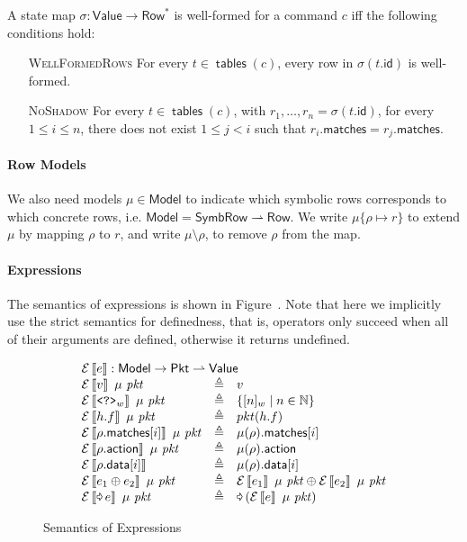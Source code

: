\documentclass{article}
\newcommand{\pkt}{\mathit{pkt}}
\newcommand{\denote}[1]{\left\llbracket#1\right\rrbracket}
\newcommand{\edenote}[1]{\mathcal{E}\denote{#1}}
\newcommand{\binop}{\mathbin{\oplus}}
\newcommand{\unop}{\mathop{\text{\pointer}}}
\newcommand{\Value}{\mathsf{Value}}
\newcommand{\Pkt}{\mathsf{Pkt}}
\newcommand{\Model}{\mathsf{Model}}
\newcommand{\Row}{\mathsf{Row}}
\newcommand{\SymbRow}{\mathsf{SymbRow}}
\newcommand{\matches}{\mathsf{matches}}
\newcommand{\action}{\mathsf{action}}
\newcommand{\data}{\mathsf{data}}
\newcommand{\id}{\mathsf{id}}
\newcommand{\havoc}{\texttt{<?>}}
\newcommand{\tables}{\mathop{\mathsf{tables}}}
\begin{document}
A state map $\sigma : \Value \to \Row^*$ is well-formed for a command $c$ iff the
following conditions hold:
\begin{enumerate}
\item[\textsc{WellFormedRows}] For every $t\in \tables(c)$, every row in $\sigma(t.\id)$ is well-formed.
\item[\textsc{NoShadow}] For every $t \in \tables(c)$, with $r_1,\ldots,r_n =
  \sigma(t.\id)$, for every $1 \leq i \leq n$, there does not exist $1 \leq j <
  i$ such that $r_i.\matches = r_j.\matches$.
\end{enumerate}
\paragraph{Row Models}
We also need models $\mu \in \Model$ to indicate which symbolic rows corresponds
to which concrete rows, i.e. $\Model = \SymbRow \rightharpoonup \Row$. We write
$\mu\{\rho \mapsto r\}$ to extend $\mu$ by mapping $\rho$ to $r$, and write $\mu
\setminus \rho$, to remove $\rho$ from the map.

\paragraph{Expressions}
The semantics of expressions is shown in Figure~\label{fig:sem-expr}. Note that
here we implicitly use the strict semantics for definedness, that is, operators
only succeed when all of their arguments are defined, otherwise it returns
undefined.

\begin{figure}[H]
  \[\begin{array}{l>{\triangleq}cl}
  \multicolumn{3}{l}{\edenote{e} : \Model \to \Pkt \rightharpoonup \Value }\\
    \edenote{v}~\mu~\pkt &&
    v \\
    \edenote{\havoc_w}~\mu~\pkt && \{[n]_w \mid n \in \mathbb N\}\\
    \edenote{h.f}~\mu~\pkt &&
    pkt(h.f)\\
    \edenote{\rho.\matches[i]}~\mu~\pkt &&
    \mu(\rho).\matches[i] \\
    \edenote{\rho.\action}~\mu~\pkt &&
    \mu(\rho).\action \\
    \edenote{\rho.\data[i]} &&
    \mu(\rho).\data[i]\\
    \edenote{e_1 \binop e_2}~\mu~\pkt&&
    \edenote{e_1}~\mu~\pkt \binop
    \edenote{e_2}~\mu~\pkt \\
    \edenote{\unop e}~\mu~\pkt &&
    \unop \left(\edenote{e}~\mu~\pkt\right)
  \end{array}
  \]
  \caption{Semantics of Expressions}
  \label{fig:sem-expr}
\end{figure}
\end{document}
